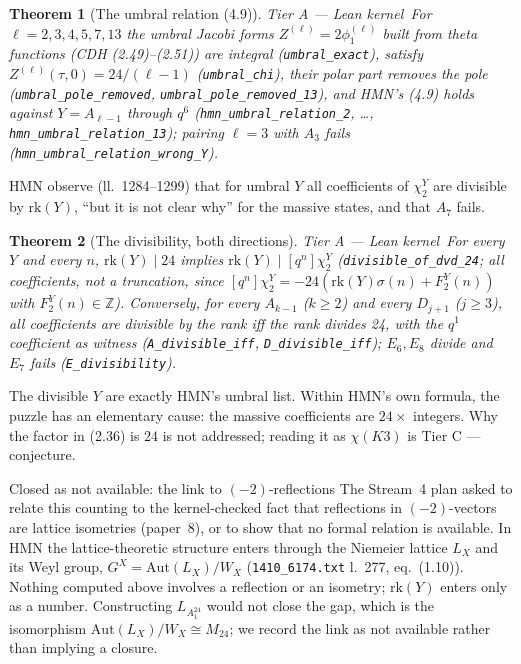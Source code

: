 \documentclass[11pt,a4paper]{article}
\newtheorem{theorem}{Theorem}[section]
\theoremstyle{remark}
\newcommand{\tierA}{\colorbox{green!15}{\textsf{\scriptsize Tier A --- Lean kernel}}}
\newcommand{\tierC}{\colorbox{orange!15}{\textsf{\scriptsize Tier C --- conjecture}}}
\newcommand{\lean}[1]{\texttt{#1}}
\newcommand{\Mtf}{M_{24}}
\begin{document}
\begin{theorem}[The umbral relation (4.9)] \tierA\
For $\ell=2,3,4,5,7,13$ the umbral Jacobi forms $Z^{(\ell)}=2\phi_1^{(\ell)}$ built from theta functions
(CDH (2.49)--(2.51)) are integral (\lean{umbral\_exact}), satisfy $Z^{(\ell)}(\tau,0)=24/(\ell-1)$
(\lean{umbral\_chi}), their polar part removes the pole (\lean{umbral\_pole\_removed},
\lean{umbral\_pole\_removed\_13}), and HMN's (4.9) holds against $Y=A_{\ell-1}$ through $q^6$
(\lean{hmn\_umbral\_relation\_2}, \dots, \lean{hmn\_umbral\_relation\_13}); pairing $\ell=3$ with $A_3$
fails (\lean{hmn\_umbral\_relation\_wrong\_Y}).
\end{theorem}

HMN observe (ll.~1284--1299) that for umbral $Y$ all coefficients of $\chi_2^Y$ are divisible by
$\mathrm{rk}(Y)$, ``but it is not clear why'' for the massive states, and that $A_7$ fails.

\begin{theorem}[The divisibility, both directions] \tierA\
For every $Y$ and every $n$, $\mathrm{rk}(Y)\mid24$ implies $\mathrm{rk}(Y)\mid[q^n]\chi_2^Y$
(\lean{divisible\_of\_dvd\_24}; all coefficients, not a truncation, since
$[q^n]\chi_2^Y=-24(\mathrm{rk}(Y)\sigma(n)+F_2^Y(n))$ with $F_2^Y(n)\in\mathbb{Z}$). Conversely, for every
$A_{k-1}$ ($k\ge2$) and every $D_{j+1}$ ($j\ge3$), all coefficients are divisible by the rank \emph{iff}
the rank divides 24, with the $q^1$ coefficient as witness (\lean{A\_divisible\_iff},
\lean{D\_divisible\_iff}); $E_6,E_8$ divide and $E_7$ fails (\lean{E\_divisibility}).
\end{theorem}
The divisible $Y$ are exactly HMN's umbral list. Within HMN's own formula, the puzzle has an elementary
cause: the massive coefficients are $24\times$ integers. Why the factor in (2.36) is $24$ is not addressed;
reading it as $\chi(K3)$ is \tierC.

\begin{casebox}{Closed as not available: the link to $(-2)$-reflections}
The Stream~4 plan asked to relate this counting to the kernel-checked fact that reflections in
$(-2)$-vectors are lattice isometries (paper~8), or to show that no formal relation is available. In HMN
the lattice-theoretic structure enters through the Niemeier lattice $L_X$ and its Weyl group,
$G^X=\mathrm{Aut}(L_X)/W_X$ (\texttt{1410\_6174.txt} l.~277, eq.~(1.10)). Nothing computed above involves a
reflection or an isometry; $\mathrm{rk}(Y)$ enters only as a number. Constructing $L_{A_1^{24}}$ would not
close the gap, which is the isomorphism $\mathrm{Aut}(L_X)/W_X\cong\Mtf$; we record the link as not
available rather than implying a closure.
\end{casebox}
\end{document}
